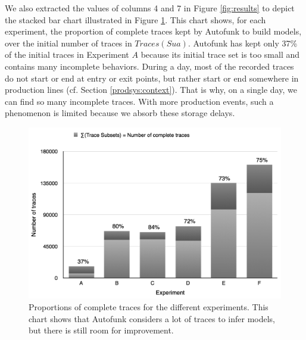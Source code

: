 We also extracted the values of columns 4 and 7 in Figure
\ref{fig:results} to depict the stacked bar chart illustrated in
Figure \ref{fig:proportions}. This chart shows, for each
experiment, the proportion of complete traces kept by Autofunk to
build models, over the initial number of traces in $Traces(Sua)$.
Autofunk has kept only 37\% of the initial traces in Experiment
$A$ because its initial trace set is too small and contains many
incomplete behaviors. During a day, most of the recorded traces
do not start or end at entry or exit points, but rather start or
end somewhere in production lines (cf. Section
\ref{prodsys:context}). That is why, on a single day, we can find
so many incomplete traces. With more production events, such a
phenomenon is limited because we absorb these storage delays.

\begin{figure}[ht]
  \includegraphics[width=1.0\linewidth]{figures/proportions.png}

  \caption{Proportions of complete traces for the different
  experiments. This chart shows that Autofunk considers a lot of
  traces to infer models, but there is still room for
  improvement.}
  \label{fig:proportions}
\end{figure}

